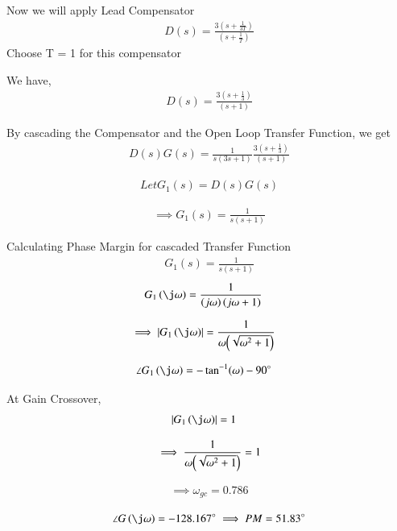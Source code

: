 \begin{enumerate}[label=\thesection.\arabic*.,ref=\thesection.\theenumi]
Now we will apply Lead Compensator
\begin{align}
D(s) = \frac{3(s+\frac{1}{3T})}{(s+\frac{1}{T})}
\end{align}
Choose T = 1 for this compensator

We have,
\begin{align}
D(s) = \frac{3(s+\frac{1}{3})}{(s+1)}
\end{align}

By cascading the Compensator and the Open Loop Transfer Function, we get
\begin{align}
D(s)G(s) = \frac{1}{s(3s+1)} \frac{3(s+\frac{1}{3})}{(s+1)}
\end{align}

\begin{align}
Let G_{1}(s) = D(s)G(s)
\end{align}

\begin{align}
\implies G_{1}(s) = \frac{1}{s(s+1)}
\end{align}

Calculating Phase Margin for cascaded Transfer Function
\begin{align}
G_{1}(s) = \frac{1}{s(s+1)}
\end{align}
\begin{align}
G_{1}\brak{\j\omega}&=\frac{1}{\brak{j\omega}\brak{j\omega+1}} 
\end{align}

\begin{align}
\implies 
\abs{G_{1}\brak{\j\omega}}&=\frac{1}{{\omega}{\brak{\sqrt{\omega^2+1}}}}
\end{align}

\begin{align}
\angle G_{1}\brak{\j\omega}&=- \tan^{-1}(\omega) - 90\degree
\end{align}

At Gain Crossover,
\begin{align}
\abs{G_{1}\brak{\j\omega}}&=1
\end{align}

\begin{align}
\implies \frac{1}{{\omega}{\left(\sqrt{\omega^2+1}\right)}} =1
\end{align}

\begin{align}
\implies \omega_{gc} = 0.786
\end{align}

\begin{align}
\angle G\brak{\j\omega} = -128.167\degree
\implies PM=51.83\degree
\end{align}


\end{enumerate}
